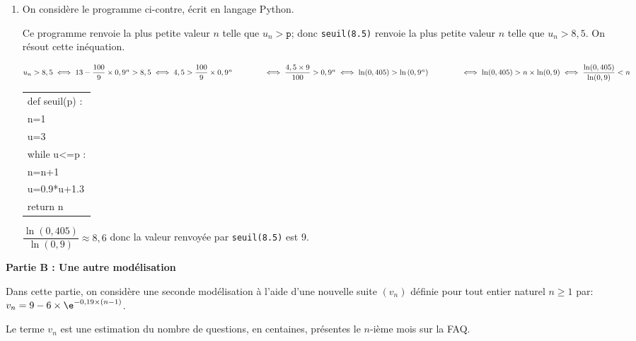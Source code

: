 \begin{enumerate}
donc la suite $(u_n)_{n\in\N*}$ est croissante.

\item On considère le programme ci-contre, écrit en langage Python.

\begin{minipage}{0.72\linewidth}


Ce programme renvoie la plus petite valeur $n$ telle que $u_n>\texttt{p}$; donc \texttt{seuil(8.5)} renvoie la plus petite valeur $n$ telle que $u_n>8,5$. On résout cette inéquation.

$u_n>8,5
\iff
13 -\dfrac{100}{9}\times 0,9^n > 8,5
\iff
4,5 > \dfrac{100}{9}\times 0,9^n\\
\phantom{u_n>8,5}
\iff
\dfrac{4,5\times 9}{100}> 0,9^n
\iff
\ln(0,405) > \ln \left (0,9^n\right )\\
\phantom{u_n>8,5}
\iff
\ln(0,405) >n \times \ln  (0,9)
\iff
\dfrac{\ln(0,405)}{\ln(0,9)} <n$
\end{minipage}\hfill
\begin{minipage}{0.25\linewidth}
\renewcommand\arraystretch{0.9}
\begin{tabularx}{\linewidth}{|X|} \hline
def seuil(p) :\\
\qquad n=1\\
\qquad u=3\\
\qquad while u<=p :\\
\qquad  \qquad n=n+1\\
\qquad \qquad u=0.9*u+1.3 \\
\qquad return n\\ \hline
\end{tabularx}
\end{minipage}

$\dfrac{\ln(0,405)}{\ln(0,9)} \approx 8,6$ donc la valeur renvoyée par \texttt{seuil(8.5)} est 9.
\end{enumerate}

\bigskip

\textbf{Partie B : Une autre modélisation}

\medskip

Dans cette partie, on considère une seconde modélisation à l'aide d'une nouvelle
suite $\left(v_n\right)$ définie pour tout entier naturel $n \geqslant 1$ par:
$v_n = 9 - 6 \times \e^{-0,19\times(n - 1)}$.

Le terme $v_n$ est une estimation du nombre de questions, en centaines, présentes le $n$-ième mois sur la FAQ.

